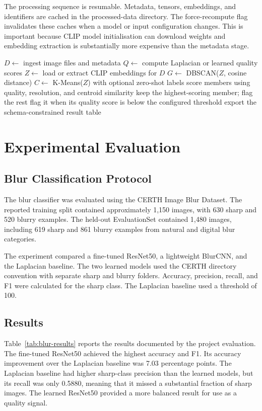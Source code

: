 \documentclass[conference]{IEEEtran}
\begin{document}
The processing sequence is resumable. Metadata, tensors, embeddings, and identifiers are cached in the processed-data directory. The force-recompute flag invalidates these caches when a model or input configuration changes. This is important because CLIP model initialisation can download weights and embedding extraction is substantially more expensive than the metadata stage.

\begin{algorithm}[htbp]
\caption{Photo de-cluttering pipeline}
\label{alg:pipeline}
\begin{algorithmic}[1]
\STATE $D \leftarrow$ ingest image files and metadata
\STATE $Q \leftarrow$ compute Laplacian or learned quality scores
\STATE $Z \leftarrow$ load or extract CLIP embeddings for $D$
\STATE $G \leftarrow$ DBSCAN($Z$, cosine distance)
\STATE $C \leftarrow$ K-Means($Z$) with optional zero-shot labels
    \STATE score members using quality, resolution, and centroid similarity
    \STATE keep the highest-scoring member; flag the rest
\ENDFOR
{}
    \STATE flag it when its quality score is below the configured threshold
\ENDFOR
\STATE export the schema-constrained result table
\end{algorithmic}
\end{algorithm}

\section{Experimental Evaluation}
\subsection{Blur Classification Protocol}
The blur classifier was evaluated using the CERTH Image Blur Dataset. The reported training split contained approximately 1,150 images, with 630 sharp and 520 blurry examples. The held-out EvaluationSet contained 1,480 images, including 619 sharp and 861 blurry examples from natural and digital blur categories.

The experiment compared a fine-tuned ResNet50, a lightweight BlurCNN, and the Laplacian baseline. The two learned models used the CERTH directory convention with separate sharp and blurry folders. Accuracy, precision, recall, and F1 were calculated for the sharp class. The Laplacian baseline used a threshold of 100.

\subsection{Results}
Table~\ref{tab:blur-results} reports the results documented by the project evaluation. The fine-tuned ResNet50 achieved the highest accuracy and F1. Its accuracy improvement over the Laplacian baseline was 7.03 percentage points. The Laplacian baseline had higher sharp-class precision than the learned models, but its recall was only 0.5880, meaning that it missed a substantial fraction of sharp images. The learned ResNet50 provided a more balanced result for use as a quality signal.
\end{document}
